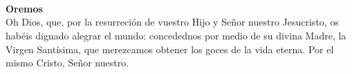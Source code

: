 \\[1mm]
\\[1mm]
\\[2mm]
\textbf{Oremos}\\
Oh Dios, que, por la resurreción de vuestro Hijo y Señor nuestro Jesucristo, os habéis dignado alegrar el mundo: 
concedednos por medio de su divina Madre, la Virgen Santísima, que merezcamos obtener los goces de la vida eterna. 
Por el mismo Cristo, Señor nuestro.\\[2mm]

